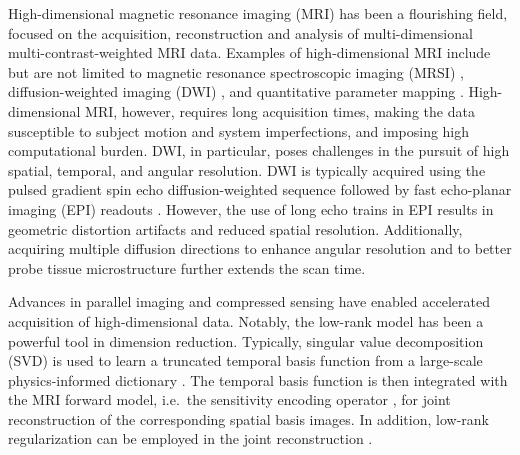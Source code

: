 \documentclass[AMA,STIX2COL,Linenumberson]{MRM}
\begin{document}
High-dimensional magnetic resonance imaging (MRI)
has been a flourishing field,
focused on the acquisition, reconstruction and analysis of
multi-dimensional multi-contrast-weighted MRI data.
Examples of high-dimensional MRI include but are not limited to
magnetic resonance spectroscopic imaging (MRSI)
\cite{brown_1982_mrsi},
diffusion-weighted imaging (DWI)
\cite{jones_2010_diff},
and quantitative parameter mapping
\cite{doneva_2010_moba,ma_2013_mrf}.
High-dimensional MRI, however, requires long acquisition times,
making the data susceptible to subject motion
and system imperfections, and imposing high computational burden.
DWI, in particular, poses challenges in the pursuit of
high spatial, temporal, and angular resolution.
DWI is typically acquired using
the pulsed gradient spin echo diffusion-weighted sequence
\cite{stejskal_1965_pgse}
followed by fast echo-planar imaging (EPI) readouts
\cite{mansfield_1977_epi}.
However, the use of long echo trains in EPI results in
geometric distortion artifacts and reduced spatial resolution.
Additionally, acquiring multiple diffusion directions
to enhance angular resolution and
to better probe tissue microstructure further extends the scan time.

Advances in parallel imaging
\cite{roemer_1990_pi,sodickson_1997_smash,
pruessmann_1999_sense,pruessmann_2001_gsense,griswold_2002_grappa}
and compressed sensing
\cite{lustig_2007_cs,block_2007_cs,liang_2007_psf}
have enabled accelerated acquisition of high-dimensional data.
Notably, the low-rank model \cite{cai_2010_svt}
has been a powerful tool in dimension reduction.
Typically, singular value decomposition (SVD) is used to
learn a truncated temporal basis function from
a large-scale physics-informed dictionary
\cite{huang_2012_t2basis,lam_2014_spice,mcgivney_2014_svdmrf}.
The temporal basis function is then integrated
with the MRI forward model,
i.e.~the sensitivity encoding operator \cite{pruessmann_2001_gsense},
for joint reconstruction of the corresponding spatial basis images.
In addition, low-rank regularization can be employed
in the joint reconstruction \cite{tamir_2017_t2shuffling}.
\end{document}

